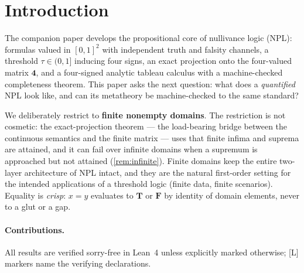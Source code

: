 \documentclass[11pt,a4paper]{article}
\theoremstyle{definition}
\newcommand{\FOUR}{\mathbf{4}}
\newcommand{\vT}{\mathbf{T}}
\newcommand{\vF}{\mathbf{F}}
\begin{document}
\section{Introduction}\label{sec:intro}

The companion paper develops the propositional core of nullivance logic
(NPL): formulas valued in $[0,1]^2$ with independent truth and falsity
channels, a threshold $\tau\in(0,1]$ inducing four signs, an exact
projection onto the four-valued matrix $\FOUR$, and a four-signed analytic
tableau calculus with a machine-checked completeness theorem. This paper
asks the next question: what does a \emph{quantified} NPL look like, and
can its metatheory be machine-checked to the same standard?

We deliberately restrict to \textbf{finite nonempty domains}. The
restriction is not cosmetic: the exact-projection theorem — the load-bearing
bridge between the continuous semantics and the finite matrix — uses that
finite infima and suprema are attained, and it can fail over infinite
domains when a supremum is approached but not attained
(\cref{rem:infinite}). Finite domains keep the entire two-layer
architecture of NPL intact, and they are the natural first-order setting
for the intended applications of a threshold logic (finite data, finite
scenarios). Equality is \emph{crisp}: $x{=}y$ evaluates to $\vT$ or $\vF$
by identity of domain elements, never to a glut or a gap.

\paragraph{Contributions.} All results are verified sorry-free in Lean~4
unless explicitly marked otherwise; [L] markers name the verifying
declarations.
\end{document}
